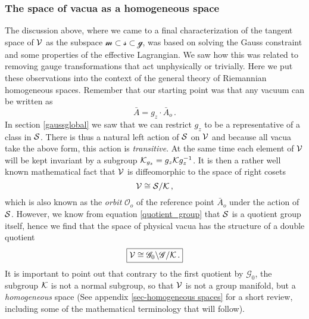 \documentclass[11pt,a4paper]{article}
\def\calg{{\mathscr G}}
\def\calk{{\cal K}}
\def\calsg{{\boldsymbol{\mathscr g}}}
\def\calsm{{\boldsymbol{\mathscr m}}}
\def\cals{{\cal S}}
\def\calss{{\boldsymbol{\mathscr s}}}
\def\calv{{\cal V}}
\begin{document}
\subsubsection{The space of vacua as a homogeneous space}
    The discussion above, where we came to a final characterization of the tangent space of $\calv$ as the subspace $\calsm\subset\calss\subset\calsg$, was based on solving the Gauss constraint and some properties of the effective Lagrangian. We saw how this was related to removing gauge transformations that act unphysically or trivially. Here we put these observations into the context of the general theory of Riemannian homogeneous spaces. Remember that our starting point was that any vacuum can be written as
    \begin{equation}
    \bar A=g_z\cdot\bar A_o\,.
    \end{equation}
    In section \ref{gaussglobal} we saw that we can restrict $g_z$ to be a representative of a class in $\cals$. There is thus a natural left action of $\cals$ on $\calv$ and because all vacua take the above form, this action is \textit{transitive}. At the same time each element of $\calv$ will be kept invariant by a subgroup $\calk_{g_z}=g_z\calk g_z^{-1}$. It is then a rather well known mathematical fact that $\calv$ is diffeomorphic to the space of right cosets 
    \begin{equation}
    \calv\cong\cals/\calk\label{quotient}\,,
    \end{equation} 
    which is also known as the \textit{orbit} $\mathcal{O}_o$ of the reference point $\bar A_o$ under the action of $\cals$. However, we know from equation \eqref{quotient_group} that $\cals$ is a quotient group  itself, hence we find that the space of physical vacua has the structure of a double quotient
    \begin{equation}
\boxed{    \calv\cong\calg_0\backslash\calg/\calk\,.\label{doublequotient}}
    \end{equation}
    It is important to point out that contrary to the first quotient by $\calg_0$, the subgroup $\calk$ is not a normal subgroup, so that $\calv$ is not a group manifold, but a \textit{homogeneous}  space (See appendix \ref{sec-homogeneous spaces} for a short review, including some of the mathematical terminology that will follow).
    
\end{document}

